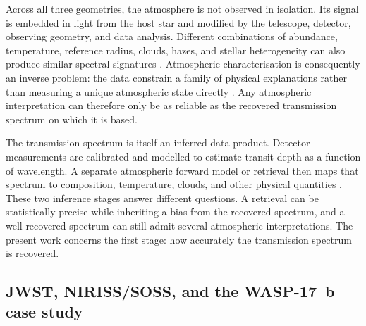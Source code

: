 Across all three geometries, the atmosphere is not observed in isolation. Its
signal is embedded in light from the host star and modified by the telescope,
detector, observing geometry, and data analysis. Different combinations of
abundance, temperature, reference radius, clouds, hazes, and stellar
heterogeneity can also produce similar spectral signatures
\citep{RackhamEtAl2018,Madhusudhan2019}. Atmospheric characterisation is
consequently an inverse problem: the data constrain a family of physical
explanations rather than measuring a unique atmospheric state directly
\citep{BarstowHeng2020}. Any atmospheric interpretation can therefore only be
as reliable as the recovered transmission spectrum on which it is based.


The transmission spectrum is itself an inferred data product. Detector
measurements are calibrated and modelled to estimate transit depth as a function
of wavelength. A separate atmospheric forward model or retrieval then maps that
spectrum to composition, temperature, clouds, and other physical quantities
\citep{Brown2001,Madhusudhan2019}.
These two inference stages answer different questions. A retrieval can be
statistically precise while inheriting a bias from the recovered spectrum, and
a well-recovered spectrum can still admit several atmospheric interpretations.
The present work concerns the first stage: how accurately the transmission
spectrum is recovered.

\subsection{JWST, NIRISS/SOSS, and the WASP-17~b case study}
\label{sec:jwst-soss-wasp17}
\label{sec:arecibo-to-jwst}
\label{sec:soss-wasp17}


